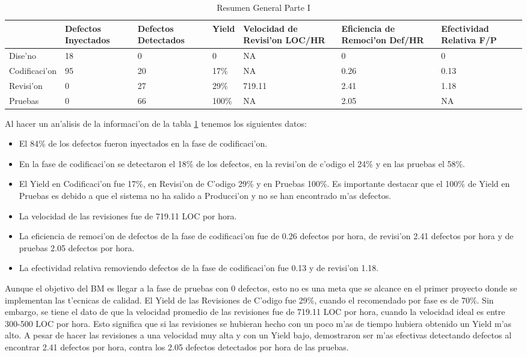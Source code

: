 \begin{table}[htbp]
	\centering
		\begin{tabular}{| p{2cm} | p{2cm} | p{2cm} | p{2cm} | p{2cm} | p{2cm} | p{2cm} |}
			\hline
			 & \textbf{Defectos Inyectados} & \textbf{Defectos Detectados} & \textbf{Yield} & \textbf{Velocidad de Revisi'on LOC/HR} & \textbf{Eficiencia de Remoci'on Def/HR} & \textbf{Efectividad Relativa F/P} \\ \hline
			 Dise'no & 18 & 0 & 0 & NA & 0 & 0 \\ \hline
			 Codificaci'on & 95 & 20 & 17\% & NA & 0.26 & 0.13 \\ \hline
			 Revisi'on & 0 & 27 & 29\% & 719.11 & 2.41 & 1.18 \\ \hline
			 Pruebas & 0 & 66 & 100\% & NA & 2.05 & NA \\ \hline
		\end{tabular}
	\caption{Resumen General Parte I}
	\label{ResumenGeneralParteI}
\end{table}

Al hacer un an'alisis de la informaci'on de la tabla \ref{ResumenGeneralParteI} tenemos los siguientes datos:

\begin{itemize}
	\item El 84\% de los defectos fueron inyectados en la fase de codificaci'on.
	\item En la fase de codificaci'on se detectaron el 18\% de los defectos, en la revisi'on de c'odigo el 24\% y en las pruebas el 58\%. 
	\item El Yield en Codificaci'on fue 17\%, en Revisi'on de C'odigo 29\% y en Pruebas 100\%. Es importante destacar que el 100\% de Yield en Pruebas es debido a que el sistema no ha salido a Producci'on y no se han encontrado m'as defectos.
	\item La velocidad de las revisiones fue de 719.11 LOC por hora.
	\item La eficiencia de remoci'on de defectos de la fase de codificaci'on fue de 0.26 defectos por hora, de revisi'on 2.41 defectos por hora y de pruebas 2.05 defectos por hora.
	\item La efectividad relativa removiendo defectos de la fase de codificaci'on fue 0.13 y de revisi'on 1.18.
\end{itemize}

Aunque el objetivo del BM es llegar a la fase de pruebas con 0 defectos, esto no es una meta que se alcance en el primer proyecto donde se implementan las t'ecnicas de calidad. El Yield de las Revisiones de C'odigo fue 29\%, cuando el recomendado por fase es de 70\%\cite{Humphrey2002}. Sin embargo, se tiene el dato de que la velocidad promedio de las revisiones fue de 719.11 LOC por hora, cuando la velocidad ideal es entre 300-500 LOC por hora. Esto significa que si las revisiones se hubieran hecho con un poco m'as de tiempo hubiera obtenido un Yield m'as alto. A pesar de hacer las revisiones a una velocidad muy alta y con un Yield bajo, demostraron ser m'as efectivas detectando defectos al encontrar 2.41 defectos por hora, contra los 2.05 defectos detectados por hora de las pruebas.

